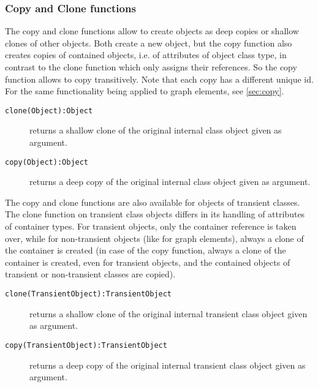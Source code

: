 \subsubsection{Copy and Clone functions}\label{subsec:copynclonefunctions}

The copy and clone functions allow to create objects as deep copies or shallow clones of other objects.
Both create a new object, but the copy function also creates copies of contained objects, i.e. of attributes of object class type, in contrast to the clone function which only assigns their references.
So the copy function allows to copy transitively.
Note that each copy has a different unique id.
For the same functionality being applied to graph elements, see \ref{sec:copy}.

\begin{description}
\item[\texttt{clone(Object):Object}] returns a shallow clone of the original internal class object given as argument.
\item[\texttt{copy(Object):Object}] returns a deep copy of the original internal class object given as argument.
\end{description}

The copy and clone functions are also available for objects of transient classes.
The clone function on transient class objects differs in its handling of attributes of container types.
For transient objects, only the container reference is taken over, while for non-transient objects (like for graph elements), always a clone of the container is created (in case of the copy function, always a clone of the container is created, even for transient objects, and the contained objects of transient or non-transient classes are copied).

\begin{description}
\item[\texttt{clone(TransientObject):TransientObject}] returns a shallow clone of the original internal transient class object given as argument.
\item[\texttt{copy(TransientObject):TransientObject}] returns a deep copy of the original internal transient class object given as argument.
\end{description}

